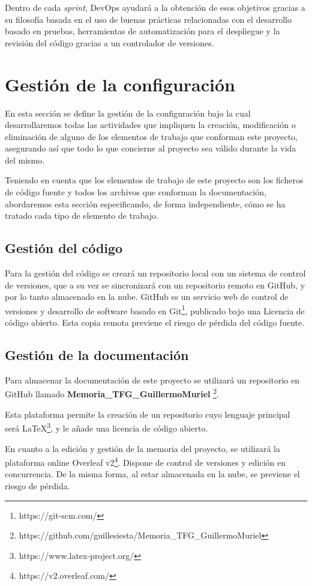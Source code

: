 Dentro de cada \textit{sprint}, DevOps ayudará a la obtención de esos objetivos gracias a su filosofía basada en el uso de buenas prácticas relacionadas con el desarrollo basado en pruebas, herramientas de automatización para el despliegue y la revisión del código gracias a un controlador de versiones.

\section{Gestión de la configuración}
En esta sección se define la gestión de la configuración bajo la cual desarrollaremos todas las actividades que impliquen la creación, modificación o eliminación de alguno de los elementos de trabajo que conforman este proyecto, asegurando así que todo lo que concierne al proyecto sea válido durante la vida del mismo.

 Teniendo en cuenta que los elementos de trabajo de este proyecto son los ficheros de código fuente y todos los archivos que conforman la documentación, abordaremos esta sección especificando, de forma independiente, cómo se ha tratado cada tipo de elemento de trabajo.
 
\subsection{Gestión del código}

Para la gestión del código se creará un repositorio local con un  sistema de control de versiones, que a su vez se sincronizará con un repositorio remoto en GitHub, y por lo tanto almacenado en la nube. GitHub es un servicio web de control de versiones y desarrollo de software basado en Git\footnote{https://git-scm.com/}, publicado bajo una Licencia de código abierto. Esta copia remota previene el riesgo de pérdida del código fuente.

\subsection{Gestión de la documentación}
Para almacenar la documentación de este proyecto se utilizará un repositorio en GitHub llamado \textbf{Memoria\_TFG\_GuillermoMuriel} \footnote{https://github.com/guillesiesta/Memoria\_TFG\_GuillermoMuriel}.

Esta plataforma permite la creación de un repositorio cuyo lenguaje principal será LaTeX\footnote{https://www.latex-project.org/}, y le añade una licencia de código abierto.

En cuanto a la edición y gestión de la memoria del proyecto, se utilizará la plataforma online Overleaf v2\footnote{https://v2.overleaf.com/}. Dispone de control de versiones y edición en concurrencia. De la misma forma, al estar almacenada en la nube, se previene el riesgo de pérdida.

